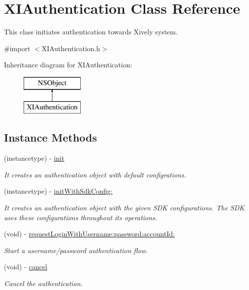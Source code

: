 \hypertarget{class_x_i_authentication}{}\section{X\+I\+Authentication Class Reference}
\label{class_x_i_authentication}


This class initiates authentication towards Xively system.  




{\ttfamily \#import $<$X\+I\+Authentication.\+h$>$}

Inheritance diagram for X\+I\+Authentication\+:\begin{figure}[H]
\begin{center}
\leavevmode
\includegraphics[height=2.000000cm]{class_x_i_authentication}
\end{center}
\end{figure}
\subsection*{Instance Methods}
\begin{DoxyCompactItemize}
\item 
(instancetype) -\/ \hyperlink{class_x_i_authentication_adc69456604cafb7618c940a3b93e7616}{init}
\begin{DoxyCompactList}\small\item\em It creates an authentication object with default configrations. \end{DoxyCompactList}\item 
(instancetype) -\/ \hyperlink{class_x_i_authentication_ab2a3d72425cbd6ae9910016f727198c1}{init\+With\+Sdk\+Config\+:}
\begin{DoxyCompactList}\small\item\em It creates an authentication object with the given S\+DK configurations. The S\+DK uses these configurations throughout its operations. \end{DoxyCompactList}\item 
(void) -\/ \hyperlink{class_x_i_authentication_a214a506a3c3b080ffa2684ea7b23fc41}{request\+Login\+With\+Username\+:password\+:account\+Id\+:}
\begin{DoxyCompactList}\small\item\em Start a username/password authentication flow. \end{DoxyCompactList}\item 
(void) -\/ \hyperlink{class_x_i_authentication_a7bf5b124824916d29f13aaff466982c9}{cancel}
\begin{DoxyCompactList}\small\item\em Cancel the authentication. \end{DoxyCompactList}\end{DoxyCompactItemize}
